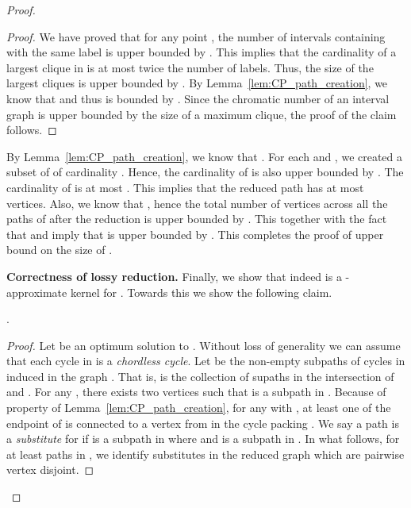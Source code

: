 \begin{proof}
\begin{proof}
We have proved that for any point , the number of intervals containing    with the same label is upper bounded by  . This implies that the cardinality of a largest clique in  is at most twice the number of labels. Thus, the size of the largest cliques is upper bounded by . 
By  Lemma~\ref{lem:CP_path_creation}, we know that  and thus 
 is bounded by . Since the chromatic number of an interval graph is upper bounded by the size of a maximum clique, the proof of the claim follows.  
\end{proof}




By 
Lemma~\ref{lem:CP_path_creation}, we know that 
. 
For each  and , we created a subset 
 of  of cardinality . Hence, the cardinality of  is also upper bounded by . 
The cardinality of   is 
at most . 
This implies that the reduced path  has at most  vertices. 
Also, we know that , hence the total number of vertices across all the paths of  after the reduction is upper bounded by . 
This together with the fact that  and   imply that   is upper bounded by . This completes the proof of upper bound on the size of . 


\medskip
\noindent 
{\bf Correctness of lossy reduction.} Finally, we show that indeed  is a  
-approximate kernel for \CP. Towards this we show the following claim. 

\begin{claim}
\label{claim:optCP}
. 
\end{claim}
\begin{proof}
Let  be an optimum solution to . Without loss of generality we can assume that 
each cycle in  is a {\em chordless cycle}.  
Let  be the non-empty subpaths of cycles in  induced in the graph . 
That is,  is the collection of supaths in the intersection of  and .
For any , 
there exists two vertices  such that  is a subpath in .
Because of property  of Lemma~\ref{lem:CP_path_creation}, for any  with , at least one of the endpoint of  is connected to a vertex from  in the cycle packing . 
We say a path  is a {\em substitute} for  if  is a subpath in  where 
 and  is a subpath in . 
In what follows,   for at least  paths in , we identify substitutes in 
the reduced graph  which are pairwise vertex disjoint.





\end{proof}
\end{proof}
